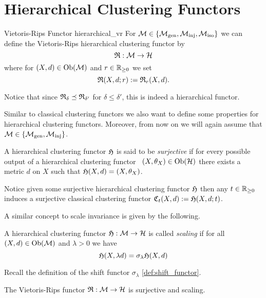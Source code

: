 \chapter{Hierarchical Clustering Functors}
\label{chapter__hierarchical}

\begin{definition}{Vietoris-Rips Functor \cite[Ex.~7.1]{Carlsson2010}}{hierarchical_vr}
For $\mathcal{M} \in \{{\mathcal{M}_\mathrm{gen}},{\mathcal{M}_\mathrm{inj}},{\mathcal{M}_\mathrm{iso}}\}$ we can define the Vietoris-Rips hierarchical clustering functor by
$$
\mathfrak{R}: \mathcal{M} \to \mathcal{H}
$$
where for $(X,d) \in \mathrm {Ob}(\mathcal{M})$ and $r \in \mathbb R_{\geq0}$ we set
$$
\mathfrak{R}(X,d; r) := \mathfrak{R}_r(X,d).
$$
\end{definition}
Notice that since $\mathfrak{R}_\delta \preceq \mathfrak{R}_{\delta'}$ for $\delta \leq \delta'$, this is indeed a hierarchical functor.

Similar to classical clustering functors we also want to define some properties for hierarchical clustering functors. Moreover, from now on we will again assume that $\mathcal{M} \in \{{\mathcal{M}_\mathrm{gen}}, {\mathcal{M}_\mathrm{inj}}\}$.

\begin{definition}{}{}
    A hierarchical clustering functor $\mathfrak{H}$ is said to be \emph{surjective} if for every possible output of a hierarchical clustering functor \ie\ $(X, \theta_X) \in \mathrm {Ob}(\mathcal{H})$ there exists a metric $d$ on $X$ such that $\mathfrak{H}(X,d) = (X, \theta_X)$.
\end{definition}

Notice given some surjective hierarchical clustering functor $\mathfrak{H}$ then any $t \in \mathbb R_{\geq0}$ induces a surjective classical clustering functor $\mathfrak{C}_t(X,d) := \mathfrak{H}(X, d; t)$.

 
A similar concept to scale invariance is given by the following.

\begin{definition}{}{}
A hierarchical clustering functor $\mathfrak{H}: \mathcal{M} \to \mathcal{H}$ is called \emph{scaling} if for all $(X,d) \in \mathrm {Ob}(\mathcal{M})$ and $\lambda > 0$ we have
$$
\mathfrak{H}(X, \lambda d) = \sigma_\lambda \mathfrak{H}(X,d)
$$
\end{definition}
Recall the definition of the shift functor $\sigma_\lambda$ \ref{def:shift_functor}.

\begin{proposition}{\cite[Sec.~7.3.1]{Carlsson2010}}{}
The Vietoris-Rips functor $\mathfrak{R}: \mathcal{M} \to \mathcal{H}$ is surjective and scaling.
\end{proposition}

